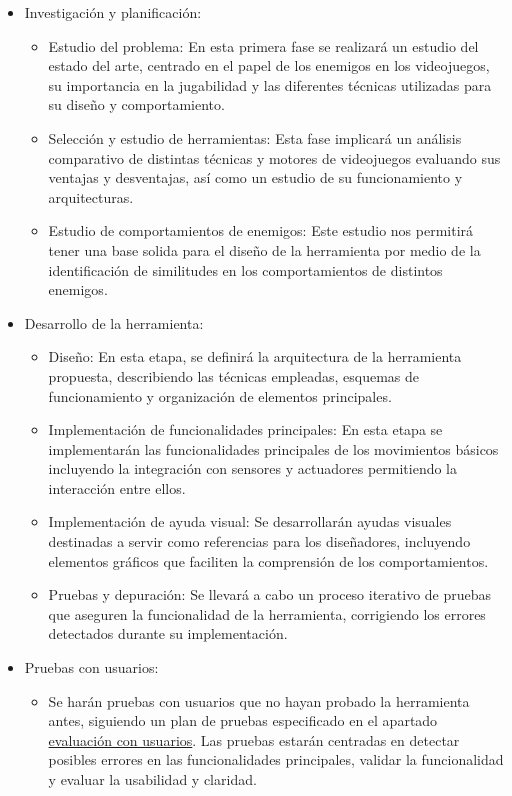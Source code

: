 \begin{itemize}
   \item  Investigación y planificación:
	\begin{itemize}
	    \item  Estudio del problema: En esta primera fase se realizará un estudio del estado del arte, centrado en el papel de los enemigos en los videojuegos, su importancia en la jugabilidad y las diferentes técnicas utilizadas para su diseño y comportamiento.
	    \item Selección y estudio de herramientas: Esta fase implicará un análisis comparativo de distintas técnicas y motores de videojuegos evaluando sus ventajas y desventajas, así como un estudio de su funcionamiento y  arquitecturas.
	    \item Estudio de comportamientos de enemigos: Este estudio nos permitirá tener una base solida para el diseño de la herramienta por medio de la identificación de similitudes en los comportamientos de distintos enemigos. 
	\end{itemize}
   \item Desarrollo de la herramienta: 
	\begin{itemize}
	    \item Diseño: En esta etapa, se definirá la arquitectura de la herramienta propuesta, describiendo las técnicas empleadas, esquemas de funcionamiento y organización de elementos principales.
	    \item  Implementación de funcionalidades principales: En esta etapa se implementarán las funcionalidades principales de los movimientos básicos incluyendo la integración con sensores y actuadores permitiendo la interacción entre ellos.
	    \item Implementación de ayuda visual: Se desarrollarán ayudas visuales destinadas a servir como referencias para los diseñadores, incluyendo elementos gráficos que faciliten la comprensión de los comportamientos. 
	    \item Pruebas y depuración: Se llevará a cabo un proceso iterativo de pruebas que aseguren la funcionalidad de la herramienta, corrigiendo los errores detectados durante su implementación.
	\end{itemize}
   \item Pruebas con usuarios:
	\begin{itemize}
	    \item Se harán pruebas con usuarios que no hayan probado la herramienta antes, siguiendo un plan de pruebas especificado en el apartado \hyperref[cap:evaluacionConUsuarios]{evaluación con usuarios}. Las pruebas estarán centradas en detectar posibles errores en las funcionalidades principales, validar la funcionalidad y evaluar la usabilidad y claridad.

\end{itemize}
\end{itemize}
